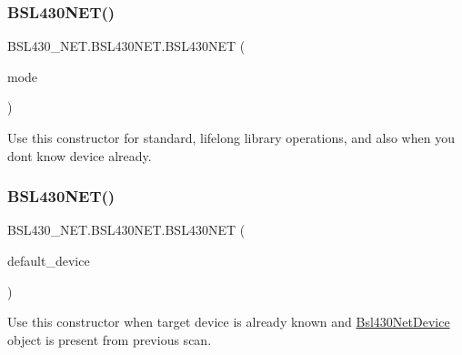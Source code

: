 \mbox{\label{class_b_s_l430___n_e_t_1_1_b_s_l430_n_e_t_aed087f8cf602cd64e72c8b0d16ef2037}} 
\subsubsection{\texorpdfstring{BSL430NET()}{BSL430NET()}\hspace{0.1cm}{\footnotesize\ttfamily [2/4]}}
{\footnotesize\ttfamily B\+S\+L430\+\_\+\+N\+E\+T.\+B\+S\+L430\+N\+E\+T.\+B\+S\+L430\+N\+ET (\begin{DoxyParamCaption}\item[{\mbox{\hyperlink{namespace_b_s_l430___n_e_t_aa1c6981cb6f279b5491d861ca555a1d7}{Mode}}}]{mode }\end{DoxyParamCaption})}



Use this constructor for standard, lifelong library operations, and also when you dont know device already. 

\mbox{\label{class_b_s_l430___n_e_t_1_1_b_s_l430_n_e_t_a7b25d6f4f548b168e49d514d06947586}} 
\subsubsection{\texorpdfstring{BSL430NET()}{BSL430NET()}\hspace{0.1cm}{\footnotesize\ttfamily [3/4]}}
{\footnotesize\ttfamily B\+S\+L430\+\_\+\+N\+E\+T.\+B\+S\+L430\+N\+E\+T.\+B\+S\+L430\+N\+ET (\begin{DoxyParamCaption}\item[{\mbox{\hyperlink{class_b_s_l430___n_e_t_1_1_bsl430_net_device}{Bsl430\+Net\+Device}}}]{default\+\_\+device }\end{DoxyParamCaption})}



Use this constructor when target device is already known and \mbox{\hyperlink{class_b_s_l430___n_e_t_1_1_bsl430_net_device}{Bsl430\+Net\+Device}} object is present from previous scan. 

\mbox{\label{class_b_s_l430___n_e_t_1_1_b_s_l430_n_e_t_ac964a8649042a7015475454b307861ef}} 
